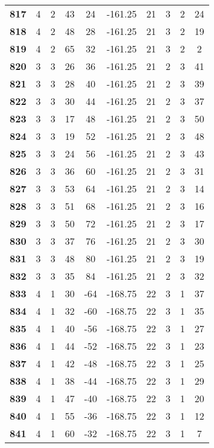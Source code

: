 \documentclass[12pt,letterpaper, onecolumn]{exam}
\begin{document}
\begin{longtable}{cccccccccc}
    \textbf{817} & 4 & 2 & 43 & 24 & -161.25 & 21 & 3 & 2 & 24 \\ 
    \textbf{818} & 4 & 2 & 48 & 28 & -161.25 & 21 & 3 & 2 & 19 \\ 
    \textbf{819} & 4 & 2 & 65 & 32 & -161.25 & 21 & 3 & 2 & 2 \\ 
    \textbf{820} & 3 & 3 & 26 & 36 & -161.25 & 21 & 2 & 3 & 41 \\ 
    \textbf{821} & 3 & 3 & 28 & 40 & -161.25 & 21 & 2 & 3 & 39 \\ 
    \textbf{822} & 3 & 3 & 30 & 44 & -161.25 & 21 & 2 & 3 & 37 \\ 
    \textbf{823} & 3 & 3 & 17 & 48 & -161.25 & 21 & 2 & 3 & 50 \\ 
    \textbf{824} & 3 & 3 & 19 & 52 & -161.25 & 21 & 2 & 3 & 48 \\ 
    \textbf{825} & 3 & 3 & 24 & 56 & -161.25 & 21 & 2 & 3 & 43 \\ 
    \textbf{826} & 3 & 3 & 36 & 60 & -161.25 & 21 & 2 & 3 & 31 \\ 
    \textbf{827} & 3 & 3 & 53 & 64 & -161.25 & 21 & 2 & 3 & 14 \\ 
    \textbf{828} & 3 & 3 & 51 & 68 & -161.25 & 21 & 2 & 3 & 16 \\ 
    \textbf{829} & 3 & 3 & 50 & 72 & -161.25 & 21 & 2 & 3 & 17 \\ 
    \textbf{830} & 3 & 3 & 37 & 76 & -161.25 & 21 & 2 & 3 & 30 \\ 
    \textbf{831} & 3 & 3 & 48 & 80 & -161.25 & 21 & 2 & 3 & 19 \\ 
    \textbf{832} & 3 & 3 & 35 & 84 & -161.25 & 21 & 2 & 3 & 32 \\ 
    \textbf{833} & 4 & 1 & 30 & -64 & -168.75 & 22 & 3 & 1 & 37 \\ 
    \textbf{834} & 4 & 1 & 32 & -60 & -168.75 & 22 & 3 & 1 & 35 \\ 
    \textbf{835} & 4 & 1 & 40 & -56 & -168.75 & 22 & 3 & 1 & 27 \\ 
    \textbf{836} & 4 & 1 & 44 & -52 & -168.75 & 22 & 3 & 1 & 23 \\ 
    \textbf{837} & 4 & 1 & 42 & -48 & -168.75 & 22 & 3 & 1 & 25 \\ 
    \textbf{838} & 4 & 1 & 38 & -44 & -168.75 & 22 & 3 & 1 & 29 \\ 
    \textbf{839} & 4 & 1 & 47 & -40 & -168.75 & 22 & 3 & 1 & 20 \\ 
    \textbf{840} & 4 & 1 & 55 & -36 & -168.75 & 22 & 3 & 1 & 12 \\ 
    \textbf{841} & 4 & 1 & 60 & -32 & -168.75 & 22 & 3 & 1 & 7 \\ 

\end{longtable}
\end{document}

